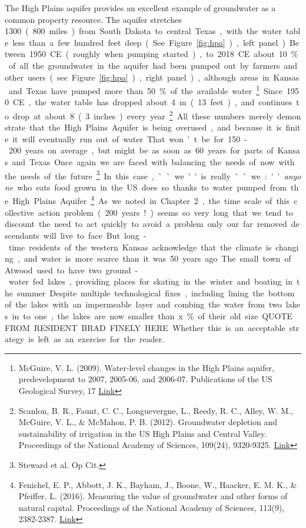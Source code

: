 The High Plains aquifer provides an excellent example of groundwater as a common property resource. The aquifer stretches \SI{1300}[{\kilo}{\metre}] (800 miles) from South Dakota to central Texas, with the water table less than a few hundred feet deep (See Figure \ref{fig:hpa}), left panel). Between 1950 CE (roughly when pumping started), to 2018 CE about 10\% of all the groundwater in the aquifer had been pumped out by farmers and other users (see Figure \ref{fig:hpa}), right panel), although areas in Kansas and Texas have pumped more than 50\% of the available water\footnote{McGuire, V. L. (2009). Water-level changes in the High Plains aquifer, predevelopment to 2007, 2005-06, and 2006-07. Publications of the US Geological Survey, 17  \href{http://digitalcommons.unl.edu/usgspubs/17}{Link}}. Since 1950 CE, the water table has dropped about \SI{4}{\metre} (13 feet), and continues to drop at about \SI{8}[{\centi}{\metre}] (3 inches) every year\footnote{Scanlon, B. R., Faunt, C. C., Longuevergne, L., Reedy, R. C., Alley, W. M., McGuire, V. L., \& McMahon, P. B. (2012). Groundwater depletion and sustainability of irrigation in the US High Plains and Central Valley. Proceedings of the National Academy of Sciences, 109(24), 9320-9325. \href{https://doi.org/10.1073/pnas.1200311109}{Link}}. All these numbers merely demonstrate that the High Plains Aquifer is being overused, and because it is finite it will eventually run out of water. That won't be for 150-200 years on average, but might be as soon as 60 years for parts of Kansas and Texas. Once again we are faced with balancing the needs of now with the needs of the future\footnote{Steward et al. Op Cit.}.In this case, ``we'' is really ``we:'' \emph{anyone} who eats food grown in the US does so thanks to water pumped from the High Plains Aquifer\footnote{Fenichel, E. P., Abbott, J. K., Bayham, J., Boone, W., Haacker, E. M. K., \& Pfeiffer, L. (2016). Measuring the value of groundwater and other forms of natural capital. Proceedings of the National Academy of Sciences, 113(9), 2382-2387. \href{https://doi.org/10.1073/pnas.1513779113}{Link}}.
As we noted in Chapter 2, the time scale of this collective action problem (200 years!) seems so very long that we tend to discount the need to act quickly to avoid a problem only our far removed descendants will live to face. But long-time residents of the western Kansas acknowledge that the climate is changing, and water is more scarce than it was 50 years ago. The small town of Atwood used to have two ground-water fed lakes, providing places for skating in the winter and boating in the summer. Despite multiple technological fixes, including lining the bottom of the lakes with an impermeable layer and combing the water from two lakes in to one, the lakes are now smaller than x\% of their old size. QUOTE FROM RESIDENT BRAD FINELY HERE. Whether this is an acceptable strategy is left as an exercise for the reader.    

